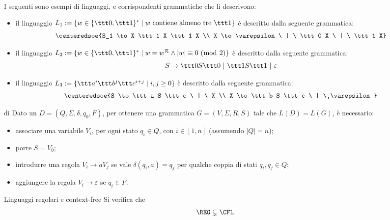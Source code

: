 \documentclass[a4paper, 12pt]{report}
\begin{document}
    \begin{example}
        I seguenti sono esempi di linguaggi, e corrispondenti grammatiche che li descrivono:

        \begin{itemize}
            \item il linguaggio $L_1 := \{w \in \{\ttt 0, \ttt 1\}^* \mid w \ \mathrm{contiene \ almeno \ tre \ \ttt 1}\}$ è descritto dalla seguente grammatica: $$\centeredsoe{S_1 \to X \ttt 1 X \ttt 1 X \\ X \to \varepsilon \ | \ \ttt 0 X \ | \ \ttt 1 X}$$
            \item il linguaggio $L_2 := \{w \in \{\ttt 0, \ttt 1\}^* \mid w = w ^\mathcal{R} \land |w| \equiv 0 \ (\bmod \ 2)\}$ è descritto dalla seguente grammatica: $$S \to \ttt 0 S \ttt 0 \ | \ \ttt 1 S \ttt 1 \ | \ \varepsilon$$
            \item il linguaggio $L_3 := \{\ttt a^i \ttt b^j \ttt c^{i + j} \mid i, j \ge 0\}$ è descritto dalla seguente grammatica: $$\centeredsoe{S \to \ttt a S \ttt c \ | \ X \\ X \to \ttt b S \ttt c \ | \ \varepsilon}$$
        \end{itemize}
    \end{example}

    \begin{framedmeth}[label={dfa into cfg}]{\CFG di \DFA}
        Dato un \DFA $D = (Q, \Sigma, \delta, q_0, F)$, per ottenere una grammatica $G = (V, \Sigma, R, S)$ tale che $L(D) = L(G)$, è necessario:

        \begin{itemize}
            \item associare una variabile $V_i$, per ogni stato $q_i \in Q$, con $i \in [1, n]$ (assumendo $|Q| = n$);
            \item porre $S = V_0$;
            \item introdurre una regola $V_i \to a V_j$ se vale $\delta(q_i, a) = q_j$ per qualche coppia di stati $q_i, q_j \in Q$;
            \item aggiungere la regola $V_i \to \varepsilon$ se $q_i \in F$.
        \end{itemize}
    \end{framedmeth}

    \begin{framedcor}[label={reg subset cfl}]{Linguaggi regolari e context-free}
        Si verifica che $$\REG \subsetneq \CFL$$
    \end{framedcor}
\end{document}
